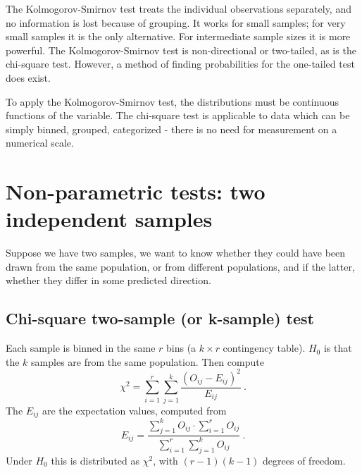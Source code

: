 \documentclass[12pt,a4paper]{article}
\begin{document}
The Kolmogorov-Smirnov test treats the individual observations separately, and no information is lost because of grouping. It works for small samples; for very small samples it is the only alternative. For intermediate sample sizes it is more powerful. The Kolmogorov-Smirnov test is non-directional or two-tailed, as is the chi-square test. However, a method of finding probabilities for the one-tailed test does exist.

To apply the Kolmogorov-Smirnov test, the distributions must be continuous functions of the variable. The chi-square test is applicable to data which can be simply binned, grouped, categorized - there is no need for measurement on a numerical scale.



















\section{Non-parametric tests: two independent samples}
Suppose we have two samples, we want to know whether they could have been drawn from the same population, or from different populations, and if the latter, whether they differ in some predicted direction. 



\subsection{Chi-square two-sample (or k-sample) test}
Each sample is binned in the same $r$ bins (a $k \times r$ contingency table). $H_0$ is that the $k$ samples are from the same population. Then compute
\begin{equation}
\chi^2 = \sum_{i=1}^r \sum_{j=1}^k \frac{(O_{ij} -E_{ij})^2}{E_{ij}} ~.
\end{equation}
The $E_{ij}$ are the expectation values, computed from
\begin{equation}
E_{ij} = \frac{\sum\limits_{j=1}^k O_{ij} \cdot \sum\limits_{i=1}^r O_{ij} }{\sum\limits_{i=1}^r \sum\limits_{j=1}^k O_{ij} } ~.
\end{equation}
Under $H_0$ this is distributed as $\chi^2$, with $(r-1)(k-1)$ degrees of freedom.
\end{document}
